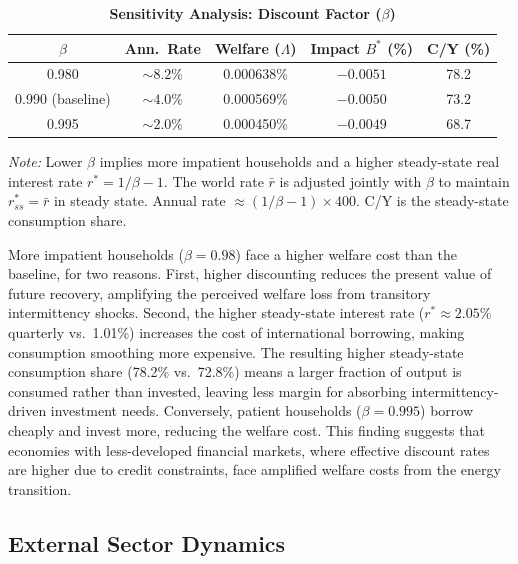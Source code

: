 \documentclass[12pt, a4paper]{article}
\begin{document}
	\begin{table}[H]
		\centering
		\caption{\textbf{Sensitivity Analysis: Discount Factor ($\beta$)}}
		\label{tab:beta_sensitivity}
		\renewcommand{\arraystretch}{1.3}
		\small
		\begin{tabular}{c c c c c}
			\toprule
			$\beta$ & \textbf{Ann.\ Rate} & \textbf{Welfare ($\Lambda$)} & \textbf{Impact $B^*$ (\%)} & \textbf{C/Y (\%)} \\
			\midrule
			0.980 & $\sim 8.2\%$ & 0.000638\% & $-0.0051$ & 78.2 \\
			0.990 (baseline) & $\sim 4.0\%$ & 0.000569\% & $-0.0050$ & 73.2 \\
			0.995 & $\sim 2.0\%$ & 0.000450\% & $-0.0049$ & 68.7 \\
			\bottomrule
		\end{tabular}
		\vspace{0.2cm}
		\parbox{\textwidth}{\footnotesize \textit{Note:} Lower $\beta$ implies more impatient households and a higher steady-state real interest rate $r^* = 1/\beta - 1$. The world rate $\bar{r}$ is adjusted jointly with $\beta$ to maintain $r^*_{ss} = \bar{r}$ in steady state. Annual rate $\approx (1/\beta - 1) \times 400$. C/Y is the steady-state consumption share.}
	\end{table}

	More impatient households ($\beta = 0.98$) face a higher welfare cost than the baseline, for two reasons. First, higher discounting reduces the present value of future recovery, amplifying the perceived welfare loss from transitory intermittency shocks. Second, the higher steady-state interest rate ($r^* \approx 2.05\%$ quarterly vs.\ 1.01\%) increases the cost of international borrowing, making consumption smoothing more expensive. The resulting higher steady-state consumption share (78.2\% vs.\ 72.8\%) means a larger fraction of output is consumed rather than invested, leaving less margin for absorbing intermittency-driven investment needs. Conversely, patient households ($\beta = 0.995$) borrow cheaply and invest more, reducing the welfare cost. This finding suggests that economies with less-developed financial markets, where effective discount rates are higher due to credit constraints, face amplified welfare costs from the energy transition.

	\subsection{External Sector Dynamics}
\end{document}
